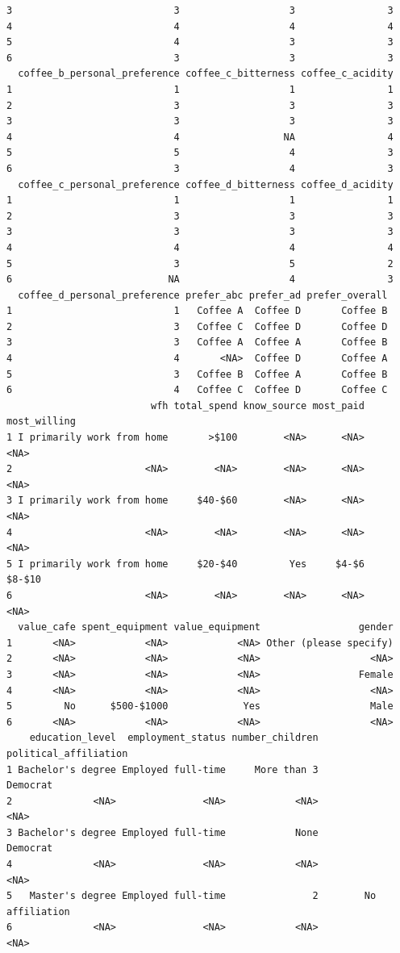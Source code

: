 \documentclass[
  letterpaper,
  DIV=11,
  numbers=noendperiod]{scrartcl}
\begin{document}
\begin{verbatim}
3                            3                   3                3
4                            4                   4                4
5                            4                   3                3
6                            3                   3                3
  coffee_b_personal_preference coffee_c_bitterness coffee_c_acidity
1                            1                   1                1
2                            3                   3                3
3                            3                   3                3
4                            4                  NA                4
5                            5                   4                3
6                            3                   4                3
  coffee_c_personal_preference coffee_d_bitterness coffee_d_acidity
1                            1                   1                1
2                            3                   3                3
3                            3                   3                3
4                            4                   4                4
5                            3                   5                2
6                           NA                   4                3
  coffee_d_personal_preference prefer_abc prefer_ad prefer_overall
1                            1   Coffee A  Coffee D       Coffee B
2                            3   Coffee C  Coffee D       Coffee D
3                            3   Coffee A  Coffee A       Coffee B
4                            4       <NA>  Coffee D       Coffee A
5                            3   Coffee B  Coffee A       Coffee B
6                            4   Coffee C  Coffee D       Coffee C
                         wfh total_spend know_source most_paid most_willing
1 I primarily work from home       >$100        <NA>      <NA>         <NA>
2                       <NA>        <NA>        <NA>      <NA>         <NA>
3 I primarily work from home     $40-$60        <NA>      <NA>         <NA>
4                       <NA>        <NA>        <NA>      <NA>         <NA>
5 I primarily work from home     $20-$40         Yes     $4-$6       $8-$10
6                       <NA>        <NA>        <NA>      <NA>         <NA>
  value_cafe spent_equipment value_equipment                 gender
1       <NA>            <NA>            <NA> Other (please specify)
2       <NA>            <NA>            <NA>                   <NA>
3       <NA>            <NA>            <NA>                 Female
4       <NA>            <NA>            <NA>                   <NA>
5         No      $500-$1000             Yes                   Male
6       <NA>            <NA>            <NA>                   <NA>
    education_level  employment_status number_children political_affiliation
1 Bachelor's degree Employed full-time     More than 3              Democrat
2              <NA>               <NA>            <NA>                  <NA>
3 Bachelor's degree Employed full-time            None              Democrat
4              <NA>               <NA>            <NA>                  <NA>
5   Master's degree Employed full-time               2        No affiliation
6              <NA>               <NA>            <NA>                  <NA>
\end{verbatim}
\end{document}
